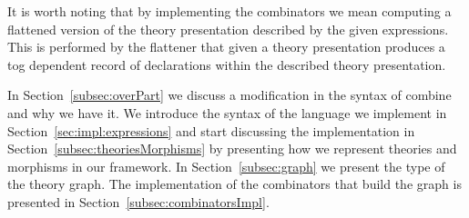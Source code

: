 It is worth noting that by implementing the combinators we mean computing a flattened version of the theory presentation described by the given expressions. This is performed by the flattener that given a theory presentation produces a tog dependent record of declarations within the described theory presentation. 

In Section~\ref{subsec:overPart} we discuss a modification in the syntax of combine and why we have it. We introduce the syntax of the language we implement in Section~\ref{sec:impl:expressions} and start discussing the implementation in Section~\ref{subsec:theoriesMorphisms} by presenting how we represent theories and morphisms in our framework. In Section~\ref{subsec:graph} we present the type of the theory graph. The implementation of the combinators that build the graph is presented in Section~\ref{subsec:combinatorsImpl}. 

